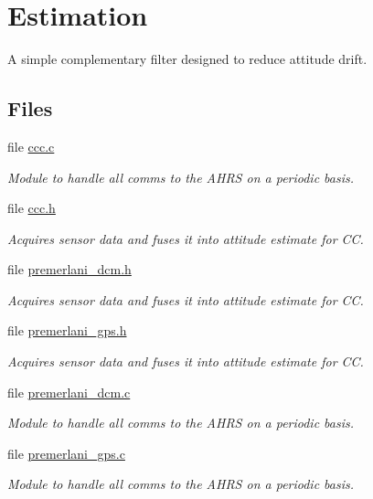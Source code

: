 \hypertarget{group___attitude}{\section{Estimation}
\label{group___attitude}
}


A simple complementary filter designed to reduce attitude drift.  


\subsection*{Files}
\begin{DoxyCompactItemize}
\item 
file \hyperlink{ccc_8c}{ccc.\-c}
\begin{DoxyCompactList}\small\item\em Module to handle all comms to the A\-H\-R\-S on a periodic basis. \end{DoxyCompactList}\item 
file \hyperlink{ccc_8h}{ccc.\-h}
\begin{DoxyCompactList}\small\item\em Acquires sensor data and fuses it into attitude estimate for C\-C. \end{DoxyCompactList}\item 
file \hyperlink{premerlani__dcm_8h}{premerlani\-\_\-dcm.\-h}
\begin{DoxyCompactList}\small\item\em Acquires sensor data and fuses it into attitude estimate for C\-C. \end{DoxyCompactList}\item 
file \hyperlink{premerlani__gps_8h}{premerlani\-\_\-gps.\-h}
\begin{DoxyCompactList}\small\item\em Acquires sensor data and fuses it into attitude estimate for C\-C. \end{DoxyCompactList}\item 
file \hyperlink{premerlani__dcm_8c}{premerlani\-\_\-dcm.\-c}
\begin{DoxyCompactList}\small\item\em Module to handle all comms to the A\-H\-R\-S on a periodic basis. \end{DoxyCompactList}\item 
file \hyperlink{premerlani__gps_8c}{premerlani\-\_\-gps.\-c}
\begin{DoxyCompactList}\small\item\em Module to handle all comms to the A\-H\-R\-S on a periodic basis. \end{DoxyCompactList}\item 

\end{DoxyCompactItemize}
